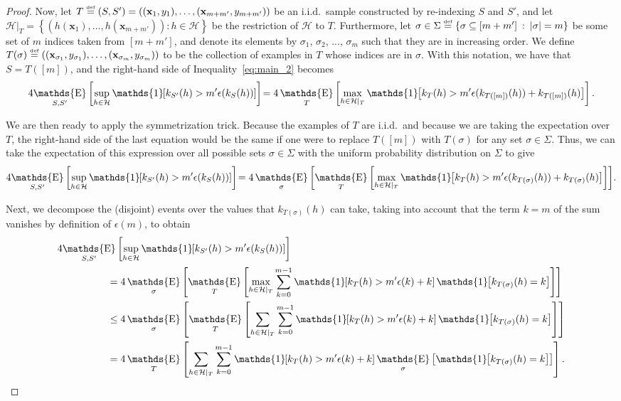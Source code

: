 \documentclass[twoside,11pt]{article}
\newcommand{\Id}[1]{\mathds{1}\hspace{-2.5pt}\left[#1\right]}
\newcommand{\cb}[1]{\left\{#1\right\}}
\newcommand{\abs}[1]{\left|#1\right|}
\renewcommand{\H}{{\mathcal{H}}}
\newcommand{\x}{\mathbf{x}}
\newcommand{\eqdef}{\overset{\smash{\mbox{\tiny \rm def}}}{=}}
\DeclareMathOperator*{\Expectation}{\mathds{E}}
\newcommand{\exv}[2]{\Expectation_{#1}\left[#2\right]}
\begin{document}
\begin{proof}
Now, let $T \eqdef (S, S') = ((\x_1,y_1), \dots, (\x_{m+m'}, y_{m+m'}))$ be an i.i.d.\ sample constructed by re-indexing $S$ and $S'$, and let $\H|_T = \cb{(h(\x_1),\dots,h(\x_{m+m'})) : h \in \H}$
be the restriction of $\H$ to $T$.
Furthermore, let $\sigma \in \Sigma \eqdef \{ \sigma \subseteq [m + m'] \: : \: \abs{\sigma} = m \}$ be some set of $m$ indices taken from $[m+m']$, and denote its elements by $\sigma_1$, $\sigma_2$, ..., $\sigma_m$ such that they are in increasing order.
We define $T(\sigma)\eqdef((\x_{\sigma_1}, y_{\sigma_1}), \dots, (\x_{\sigma_m}, y_{\sigma_m}))$ to be the collection of examples in $T$ whose indices are in $\sigma$.
With this notation, we have that $S = T([m])$, and the right-hand side of Inequality~\eqref{eq:main_2} becomes
\begin{align*}
4\! \exv{S, S'}{\sup_{h\in \H} \Id{k_{S'}(h) > m'\epsilon(k_S(h))}}
    \!= 4 \exv{T}{\max_{h\in \H|_T} \Id{ k_{T}(h) > m'\epsilon(k_{T([m])}(h)) + k_{T([m])}(h)}}.
\end{align*}

We are then ready to apply the symmetrization trick.
Because the examples of $T$ are i.i.d.\ and because we are taking the expectation over $T$, the right-hand side of the last equation would be the same if one were to replace $T([m])$ with $T(\sigma)$ for any set $\sigma \in \Sigma$.
Thus, we can take the expectation of this expression over all possible sets $\sigma\in\Sigma$ with the uniform probability distribution on $\Sigma$ to give
\begin{align*}
4\! \exv{S, S'}{\sup_{h\in \H} \Id{k_{S'}(h) > m'\epsilon(k_S(h))}}
    \!= 4 \exv{\sigma}{\exv{T}{\max_{h\in \H|_T} \Id{ k_{T}(h) > m'\epsilon(k_{T(\sigma)}(h)) + k_{T(\sigma)}(h)}}}\!.
\end{align*}

Next, we decompose the (disjoint) events over the values that $k_{T(\sigma)}(h)$ can take, taking into account that the term $k=m$ of the sum vanishes by definition of $\epsilon(m)$, to obtain
\begin{align}
&4\! \exv{S, S'}{\sup_{h\in \H} \Id{k_{S'}(h) > m'\epsilon(k_S(h))}}\nonumber\\
    &\hspace{50pt}= 4 \exv{\sigma}{\exv{T}{\max_{h\in \H|_T} \sum_{k=0}^{m-1}\Id{ k_{T}(h) > m'\epsilon(k) + k} \Id{k_{T(\sigma)}(h) = k} }}\nonumber\\
    &\hspace{50pt}\le 4 \exv{\sigma}{\exv{T}{\sum_{h\in \H|_T} \sum_{k=0}^{m-1}\Id{ k_{T}(h) > m'\epsilon(k) + k} \Id{k_{T(\sigma)}(h) = k} }}\nonumber\\
    &\hspace{50pt}= 4 \exv{T}{\sum_{h\in \H|_T} \sum_{k=0}^{m-1}\Id{ k_{T}(h) > m'\epsilon(k) + k} \exv{\sigma}{\Id{k_{T(\sigma)}(h) = k} }}.\label{eq:main_3}
\end{align}


\end{proof}
\end{document}

